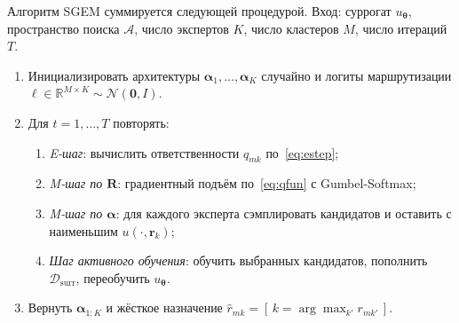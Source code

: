 Алгоритм SGEM суммируется следующей процедурой. Вход: суррогат
$u_{\boldsymbol{\theta}}$, пространство поиска $\mathcal{A}$, число
экспертов $K$, число кластеров $M$, число итераций $T$.
\begin{enumerate}
    \item Инициализировать архитектуры
    $\boldsymbol{\alpha}_1, \dots, \boldsymbol{\alpha}_K$ случайно и
    логиты маршрутизации
    $\boldsymbol{\ell} \in \mathbb{R}^{M\times K} \sim \mathcal{N}(\mathbf{0}, I)$.
    \item Для $t = 1, \ldots, T$ повторять:
    \begin{enumerate}
        \item \emph{E-шаг}: вычислить ответственности
        $q_{mk}$ по~\eqref{eq:estep};
        \item \emph{M-шаг по $\mathbf{R}$}: градиентный подъём
        по~\eqref{eq:qfun} с Gumbel-Softmax;
        \item \emph{M-шаг по $\boldsymbol{\alpha}$}: для каждого эксперта
        сэмплировать кандидатов и оставить с наименьшим
        $u(\cdot, \mathbf{r}_k)$;
        \item \emph{Шаг активного обучения}: обучить выбранных кандидатов,
        пополнить $\mathcal{D}_{\text{surr}}$, переобучить
        $u_{\boldsymbol{\theta}}$.
    \end{enumerate}
    \item Вернуть $\boldsymbol{\alpha}_{1:K}$ и жёсткое назначение
    $\hat{r}_{mk} = [\,k = \arg\max_{k'} r_{mk'}\,]$.
\end{enumerate}


